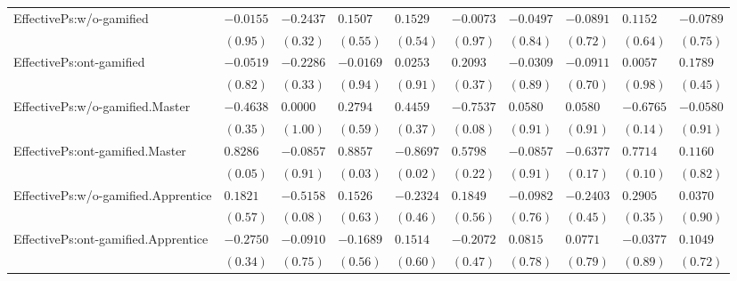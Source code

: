 \begin{landscape}
{\begin{longtable}{lR{1.5cm}R{1.5cm}R{1.5cm}R{1.5cm}R{1.5cm}R{1.5cm}R{1.5cm}R{1.5cm}R{1.5cm}}
EffectivePs:w/o-gamified&$-0.0155$&$-0.2437$&$ 0.1507$&$ 0.1529$&$-0.0073$&$-0.0497$&$-0.0891$&$ 0.1152$&$-0.0789$\tabularnewline
 &$(0.95)$&$(0.32)$&$(0.55)$&$(0.54)$&$(0.97)$&$(0.84)$&$(0.72)$&$(0.64)$&$(0.75)$\tabularnewline
EffectivePs:ont-gamified&$-0.0519$&$-0.2286$&$-0.0169$&$ 0.0253$&$ 0.2093$&$-0.0309$&$-0.0911$&$ 0.0057$&$0.1789$\tabularnewline
 &$(0.82)$&$(0.33)$&$(0.94)$&$(0.91)$&$(0.37)$&$(0.89)$&$(0.70)$&$(0.98)$&$(0.45)$\tabularnewline
EffectivePs:w/o-gamified.Master&$-0.4638$&$0.0000$&$ 0.2794$&$ 0.4459$&$-0.7537$&$0.0580$&$0.0580$&$-0.6765$&$-0.0580$\tabularnewline
 &$(0.35)$&$(1.00)$&$(0.59)$&$(0.37)$&$(0.08)$&$(0.91)$&$(0.91)$&$(0.14)$&$(0.91)$\tabularnewline
EffectivePs:ont-gamified.Master&$ 0.8286$&$-0.0857$&$ 0.8857$&$-0.8697$&$ 0.5798$&$-0.0857$&$-0.6377$&$ 0.7714$&$ 0.1160$\tabularnewline
 &$(0.05)$&$(0.91)$&$(0.03)$&$(0.02)$&$(0.22)$&$(0.91)$&$(0.17)$&$(0.10)$&$(0.82)$\tabularnewline
EffectivePs:w/o-gamified.Apprentice&$ 0.1821$&$-0.5158$&$ 0.1526$&$-0.2324$&$ 0.1849$&$-0.0982$&$-0.2403$&$ 0.2905$&$ 0.0370$\tabularnewline
 &$(0.57)$&$(0.08)$&$(0.63)$&$(0.46)$&$(0.56)$&$(0.76)$&$(0.45)$&$(0.35)$&$(0.90)$\tabularnewline
EffectivePs:ont-gamified.Apprentice&$-0.2750$&$-0.0910$&$-0.1689$&$0.1514$&$-0.2072$&$0.0815$&$0.0771$&$-0.0377$&$0.1049$\tabularnewline
 &$(0.34)$&$(0.75)$&$(0.56)$&$(0.60)$&$(0.47)$&$(0.78)$&$(0.79)$&$(0.89)$&$(0.72)$\tabularnewline
\hline
\end{longtable}}\end{landscape}

